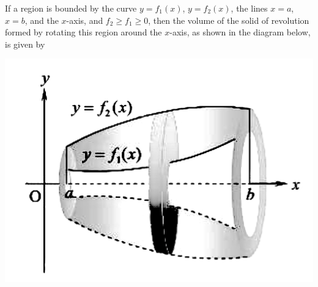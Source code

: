If a region is bounded by the curve $y = f_1(x)$, $y = f_2(x)$, the lines $x =
    a$, $x = b$, and the $x$-axis, and $f_2 \geq f_1 \geq 0$, then the volume of
the solid of revolution formed by rotating this region around the $x$-axis, as
shown in the diagram below, is given by
\begin{center}
\end{center}
\begin{center}
    \includegraphics[scale=0.15]{assets/28-29.png}
\end{center}

